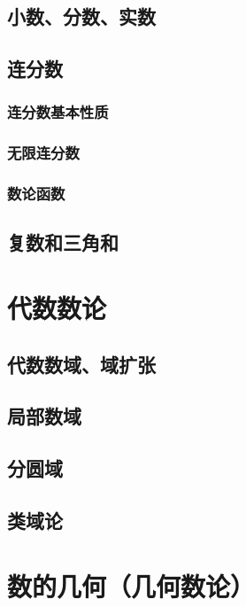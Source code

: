 \documentclass[UTF8]{../09-Mathematics}
\begin{document}
\section{小数、分数、实数}





\section{连分数}

\subsection{连分数基本性质}

\subsection{无限连分数}

\subsection{数论函数}




\section{复数和三角和}





\chapter{代数数论}
    \section{代数数域、域扩张}
    \section{局部数域}
    \section{分圆域}
    \section{类域论}

\chapter{数的几何（几何数论）}
\end{document}
